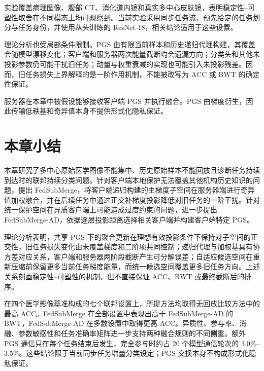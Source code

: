 实验覆盖病理图像、腹部 CT、消化道内镜和真实多中心皮肤镜，表明稳定性--可塑性取舍在不同模态上均可观察到。当前实验采用同步任务流、预先给定的任务划分与任务身份，并使用从头训练的 ResNet-18，相关结论适用于这些设置。

理论分析也受局部条件限制。PGS 由有限当前样本和历史递归代理构建，其覆盖会随模型漂移变化；客户端和服务器两次能量截断均会遗漏方向；分类头和其他未投影参数仍可能干扰旧任务；动量与权重衰减的实现也可能引入未投影残差。因而，旧任务损失上界解释的是一阶作用机制，不能被改写为 ACC 或 BWT 的确定性保证。

服务器在本章中被假设能够接收客户端 PGS 并执行融合。PGS 由梯度衍生，因此传输低秩基和奇异值本身不提供形式化隐私保证。

\section{本章小结}
\label{sec:fedsubmerge-summary}

本章研究了多中心原始医学图像不能集中、历史原始样本不能回放且诊断任务持续到达时的联邦持续分类问题。针对客户端本地保护无法覆盖其他机构历史知识的问题，提出 FedSubMerge，将客户端递归构建的主梯度子空间在服务器端进行奇异值加权融合，并在后续任务中通过正交补梯度投影降低对旧任务的一阶干扰。针对统一保护空间在异质客户端上可能造成过度约束的问题，进一步提出 FedSubMerge-AD，依据逐层投影距离选择相关客户端并构建客户端特定 PGS。

理论分析表明，共享 PGS 下的聚合更新在理想有效投影条件下保持对子空间的正交性，旧任务损失变化由未覆盖梯度和二阶项共同控制；递归代理与加权基具有协方差对应关系，客户端和服务器两阶段截断产生可分解误差；自适应候选空间在重新压缩前保留更多当前任务梯度能量，而统一候选空间覆盖更多旧任务方向。上述关系刻画稳定性--可塑性的机制，但不直接保证 ACC、BWT 或最终截断后的排序。

在四个医学影像基准构成的七个联邦设置上，所提方法均取得无回放比较方法中的最高 ACC。FedSubMerge 在全部设置中表现出高于 FedSubMerge-AD 的 BWT，FedSubMerge-AD 在多数设置中取得更高 ACC。异质性、参与率、消融、参数敏感性和任务准确率矩阵进一步支持两种融合规则的不同侧重。额外 PGS 通信只在每个任务结束后发生，完全参与时约占 20 个模型通信轮次的 $3.0\%$--$3.5\%$。这些结论限于当前同步任务增量分类设定；PGS 交换本身不构成形式化隐私保证。
